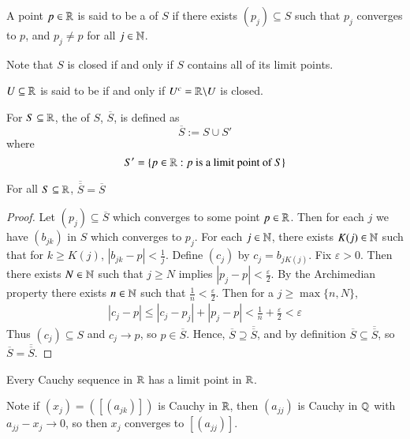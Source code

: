 \begin{defn}
    A point $p \in \mathbb R$ is said to be a  of $S$ if there exists $(p_j) \subseteq S$ such that $p_j$ converges to $p$, and $p_j \neq p$ for all $j \in \mathbb N$.
\end{defn}

Note that $S$ is closed if and only if $S$ contains all of its limit points.

\begin{defn}
    $U\subseteq \mathbb R$ is said to be  if and only if $U^c = \mathbb R\backslash U$ is closed.
\end{defn}

\begin{defn}
    For $S \subseteq \mathbb R$, the  of $S$, $\overline{S}$, is defined as $$\overline{S}:= S \cup S'$$ where $$S' = \{p \in \mathbb R: p \text{ is a limit point of } S\}$$
\end{defn}

\begin{prop}
    For all $S \subseteq \mathbb R$, $\overline{\overline{S}} = \overline{S}$
\end{prop}
\begin{proof}
    Let $(p_j) \subseteq \overline{S}$ which converges to some point $p \in \mathbb R$. Then for each $j$ we have $(b_{jk})$ in $S$ which converges to $p_j$. For each $j \in \mathbb N$, there exists $K(j) \in \mathbb N$ such that for $k \geq K(j)$, $|b_{jk} - p| < \frac{1}{j}$. Define $(c_j)$ by $c_j = b_{jK(j)}$. Fix $\varepsilon > 0$. Then there exists $N \in \mathbb N$ such that $j \geq N$ implies $|p_j - p| < \frac{\varepsilon}{2}$. By the Archimedian property there exists $n \in \mathbb N$ such that $\frac{1}{n} < \frac{\varepsilon}{2}$. Then for a $j \geq \max\{n,N\}$, \begin{align*}
        |c_j - p| \leq |c_j - p_j| + |p_j - p| < \frac{1}{n} + \frac{\varepsilon}{2} < \varepsilon
    \end{align*}
    Thus $(c_j) \subseteq S$ and $c_j\rightarrow p$, so $p \in \overline{S}$. Hence, $\overline{S}\supseteq \overline{\overline{S}}$, and by definition $\overline{S} \subseteq \overline{\overline{S}}$, so $\overline{S} = \overline{\overline{S}}$.
\end{proof}

\begin{thm}\label{thm:1.9.1}
    Every Cauchy sequence in $\mathbb R$ has a limit point in $\mathbb R$.
\end{thm}

Note if $(x_j) = ([(a_{jk})])$ is Cauchy in $\mathbb R$, then $(a_{jj})$ is Cauchy in $\mathbb Q$ with $a_{jj} - x_j \rightarrow 0$, so then $x_j$ converges to $[(a_{jj})]$.

